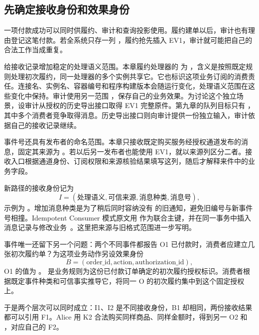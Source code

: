 \subsection*{先确定接收身份和效果身份}

一项付款成功可以同时供履约、审计和查询投影使用。履约建单以后，审计也有理由登记这笔付款。若全系统只存一列 ，履约抢先插入 EV1，审计就可能把自己的合法工作当成重复。

给接收记录增加稳定的处理语义范围。本章履约处理器的  为 ，含义是按照既定规则处理初次履约，同一处理器的多个实例共享它。它也标识这项业务订阅的消费责任。连接名、实例名、容器编号和程序构建版本会随运行变化，处理语义范围在这些变化中保持。审计使用另一范围 ，保存自己的业务效果。为讨论这个独立场景，设审计从授权的历史导出接口取得 EV1 完整原件。第九章的队列目标只有 ，其中多个消费者竞争取得消息。历史导出接口则向审计提供一份独立输入，审计依据自己的接收记录继续。

事件号还具有发布者的命名范围。本章只接收既定购买服务经授权通道发布的消息，固定其来源为 。若以后另一发布者也能使用 EV1，就以来源列区分二者。接收入口根据通道身份、订阅权限和来源核验结果填写这列，随后才解释来件中的业务字段。

新路径的接收身份记为
\[
I=(\text{处理语义},\text{可信来源},\text{消息种类},\text{消息号}),
\]
示例为 。增加消息种类是为了稍后同时容纳没有  的旧通知，避免旧编号与新事件号相撞。Idempotent Consumer 模式原文用  作为联合主键，并在同一事务中插入消息记录与修改业务~\cite{idempotent-consumer,handling-duplicate-messages}。这里把来源与旧格式范围进一步写明。

事件唯一还留下另一个问题：两个不同事件都报告 O1 已付款时，消费者应建立几张初次履约单？为这项业务动作另设效果身份
\[
B=(\text{order\_id},\text{action},\text{authorization\_id}),
\]
O1 的值为 。 是业务规则为这份已付款订单确定的初次履约授权标识。消费者根据既定事件种类和可信事实推导它，将同一 O 的初次履约集中到这个固定授权上。

于是两个层次可以同时成立：I1、I2 是不同接收身份，B1 却相同，两份接收结果都可以引用 F1。Alice 用 K2 合法购买同样商品、同样金额时，得到另一 O2 和 ，对应自己的 F2。


